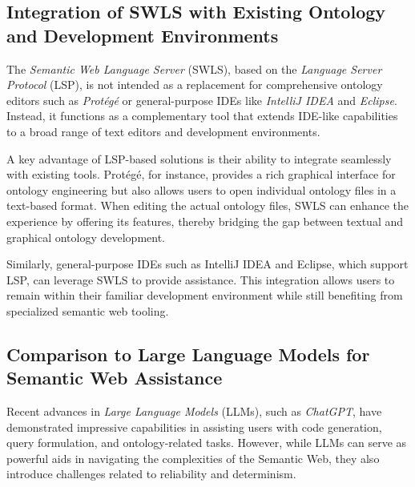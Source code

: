 \subsection{Integration of SWLS with Existing Ontology and Development Environments}

The \textit{Semantic Web Language Server} (SWLS), based on the \textit{Language Server Protocol} (LSP), is not intended as a replacement for comprehensive ontology editors such as \textit{Protégé} or general-purpose IDEs like \textit{IntelliJ IDEA} and \textit{Eclipse}.
Instead, it functions as a complementary tool that extends IDE-like capabilities to a broad range of text editors and development environments.

A key advantage of LSP-based solutions is their ability to integrate seamlessly with existing tools.
Protégé, for instance, provides a rich graphical interface for ontology engineering but also allows users to open individual ontology files in a text-based format.
When editing the actual ontology files, SWLS can enhance the experience by offering its features, thereby bridging the gap between textual and graphical ontology development.

Similarly, general-purpose IDEs such as IntelliJ IDEA and Eclipse, which support LSP, can leverage SWLS to provide assistance. 
This integration allows users to remain within their familiar development environment while still benefiting from specialized semantic web tooling.



\subsection{Comparison to Large Language Models for Semantic Web Assistance}

Recent advances in \textit{Large Language Models} (LLMs), such as \textit{ChatGPT}, have demonstrated impressive capabilities in assisting users with code generation, query formulation, and ontology-related tasks. 
However, while LLMs can serve as powerful aids in navigating the complexities of the Semantic Web, they also introduce challenges related to reliability and determinism.  


